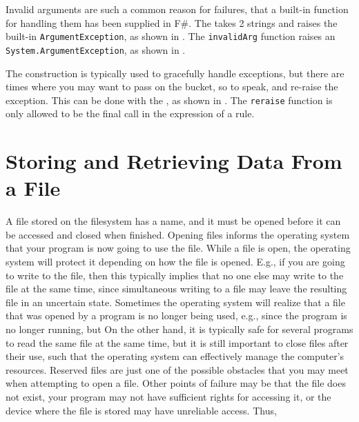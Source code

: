 \documentclass[fsharpNotes.tex]{subfiles}
\begin{document}
Invalid arguments are such a common reason for failures, that a built-in function for handling them has been supplied in F\#. The  takes 2 strings and raises the built-in \lstinline!ArgumentException!, as shown in .
%
%
The \lstinline{invalidArg} function raises an \lstinline{System.ArgumentException}, as shown in .
%
%

The  construction is typically used to gracefully handle exceptions, but there are times where you may want to pass on the bucket, so to speak, and re-raise the exception. This can be done with the , as shown in .
%
%
The \lstinline!reraise! function is only allowed to be the final call in the expression of a  rule.

\section{Storing and Retrieving Data From a File}
A file stored on the filesystem has a name, and it must be opened before it can be accessed and closed when finished. Opening files informs the operating system that your program is now going to use the file. While a file is open, the operating system will protect it depending on how the file is opened. E.g., if you are going to write to the file, then this typically implies that no one else may write to the file at the same time, since simultaneous writing to a file may leave the resulting file in an uncertain state. Sometimes the operating system will realize that a file that was opened by a program is no longer being used, e.g., since the program is no longer running, but  On the other hand, it is typically safe for several programs to read the same file at the same time, but it is still important to close files after their use, such that the operating system can effectively manage the computer's resources. Reserved files are just one of the possible obstacles that you may meet when attempting to open a file. Other points of failure may be that the file does not exist, your program may not have sufficient rights for accessing it, or the device where the file is stored may have unreliable access. Thus, 
\end{document}
